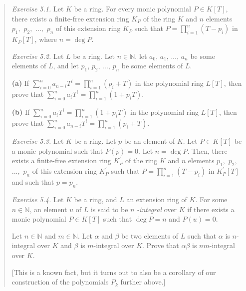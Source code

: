 \documentclass[numbers=enddot,12pt,final,onecolumn,notitlepage]{scrartcl}%
\begin{document}
\begin{quotation}
\textit{Exercise 5.1.} Let $K$ be a ring. For every monic polynomial $P\in
K\left[  T\right]  $, there exists a finite-free extension ring $K_{P}$ of the
ring $K$ and $n$ elements $p_{1},$ $p_{2},$ $...,$ $p_{n}$ of this extension
ring $K_{P}$ such that $P=\prod\limits_{i=1}^{n}\left(  T-p_{i}\right)  $ in
$K_{P}\left[  T\right]  $, where $n=\deg P$.

\textit{Exercise 5.2.} Let $L$ be a ring. Let $n\in\mathbb{N}$, let $a_{0}$,
$a_{1}$, $...$, $a_{n}$ be some elements of $L$, and let $p_{1}$, $p_{2}$,
$...$, $p_{n}$ be some elements of $L$.

\textbf{(a)} If $\sum\limits_{i=0}^{n}a_{n-i}T^{i}=\prod\limits_{i=1}%
^{n}\left(  p_{i}+T\right)  $ in the polynomial ring $L\left[  T\right]  $,
then prove that $\sum\limits_{i=0}^{n}a_{i}T^{i}=\prod\limits_{i=1}^{n}\left(
1+p_{i}T\right)  $.

\textbf{(b)} If $\sum\limits_{i=0}^{n}a_{i}T^{i}=\prod\limits_{i=1}^{n}\left(
1+p_{i}T\right)  $ in the polynomial ring $L\left[  T\right]  $, then prove
that $\sum\limits_{i=0}^{n}a_{n-i}T^{i}=\prod\limits_{i=1}^{n}\left(
p_{i}+T\right)  $.

\textit{Exercise 5.3.} Let $K$ be a ring. Let $p$ be an element of $K$. Let
$P\in K\left[  T\right]  $ be a monic polynomial such that $P\left(  p\right)
=0$. Let $n=\deg P$. Then, there exists a finite-free extension ring
$K_{P}^{\prime}$ of the ring $K$ and $n$ elements $p_{1},$ $p_{2},$ $...,$
$p_{n}$ of this extension ring $K_{P}^{\prime}$ such that $P=\prod
\limits_{i=1}^{n}\left(  T-p_{i}\right)  $ in $K_{P}^{\prime}\left[  T\right]
$ and such that $p=p_{n}$.

\textit{Exercise 5.4.} Let $K$ be a ring, and $L$ an extension ring of $K$.
For some $n\in\mathbb{N}$, an element $u$ of $L$ is said to be $n$%
\textit{-integral} over $K$ if there exists a monic polynomial $P\in K\left[
T\right]  $ such that $\deg P=n$ and $P\left(  u\right)  =0$.

Let $n\in\mathbb{N}$ and $m\in\mathbb{N}$. Let $\alpha$ and $\beta$ be two
elements of $L$ such that $\alpha$ is $n$-integral over $K$ and $\beta$ is
$m$-integral over $K$. Prove that $\alpha\beta$ is $nm$-integral over $K$.

[This is a known fact, but it turns out to also be a corollary of our
construction of the polynomials $P_{k}$ further above.]


\end{quotation}
\end{document}
